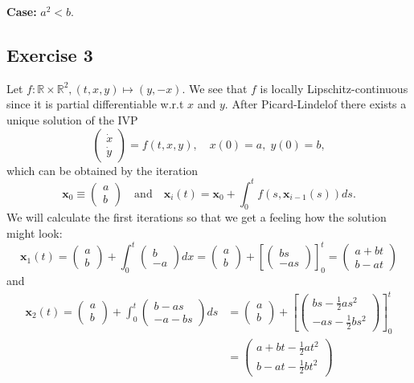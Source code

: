 \documentclass[a4paper]{article}
\begin{document}
\textbf{Case:} $a^2 < b$.

\subsection*{Exercise 3}
Let $f: \mathbb R \times \mathbb R^2, (t,x,y) \mapsto (y, -x)$. We see that $f$ is locally Lipschitz-continuous since it is partial differentiable w.r.t $x$ and $y$. After Picard-Lindelof there exists a unique solution of the IVP
\[
	\begin{pmatrix}\dot x \\ \dot y\end{pmatrix} = f(t,x,y), \quad x(0) = a, \; y(0) = b,
\]
 which can be obtained by the iteration $$\mathbf x_0 \equiv \begin{pmatrix}a\\b\end{pmatrix} \quad \text{and} \quad \mathbf x_i(t) = \mathbf x_0 + \int^t_0 f(s, \mathbf x_{i-1}(s)) ds.$$ We will calculate the first iterations so that we get a feeling how the solution might look:
\[
 	\mathbf x_1(t) = \begin{pmatrix}a\\b\end{pmatrix} + \int^t_0  \begin{pmatrix}b\\-a\end{pmatrix} dx =  \begin{pmatrix}a\\b\end{pmatrix} + [ \begin{pmatrix}bs\\-as\end{pmatrix}]^t_0 =  \begin{pmatrix}a+bt\\b-at\end{pmatrix}
\]
 and
 \begin{align*}
 	\mathbf x_2(t) =  \begin{pmatrix}a\\b\end{pmatrix} + \int^t_0  \begin{pmatrix}b-as\\ -a-bs \end{pmatrix} ds &=  \begin{pmatrix}a\\b\end{pmatrix} + [ \begin{pmatrix}bs- \frac{1}{2}as^2\\-as-\frac{1}{2}bs^2\end{pmatrix}]^t_0 \\&=   \begin{pmatrix}a+bt- \frac{1}{2}at^2\\b-at-\frac{1}{2}bt^2\end{pmatrix}
 \end{align*}
 
\end{document}
